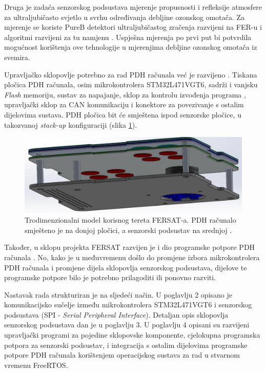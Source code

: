     Druga je zadaća senzorskog podsustava mjerenje propusnosti i refleksije atmosfere za ultraljubičasto svjetlo u svrhu određivanja debljine ozonskog omotača. Za mjerenje se koriste PureB detektori ultraljubičastog zračenja razvijeni na FER-u \cite{diplomski_filip_bogdanovic} i algoritmi razvijeni za tu namjenu \cite{zavrsni_kristian_stepancic}. Uspješna mjerenja po prvi put bi potvrdila mogućnost korištenja ove tehnologije u mjerenjima debljine ozonskog omotača iz svemira.

    Upravljačko sklopovlje potrebno za rad PDH računala već je razvijeno \cite{zavrsni_filip_juric}. Tiskana pločica PDH računala, osim mikrokontrolera STM32L471VGT6, sadrži i vanjsku \textit{Flash} memoriju, sustav za napajanje, sklop za kontrolu izvođenja programa , upravljački sklop za CAN komunikaciju i konektore za povezivanje s ostalim dijelovima sustava. PDH pločica bit će smještena ispod senzorske pločice, u takozvanoj \textit{stack-up} konfiguraciji (slika \ref{fig:fersat_3d}).

    \begin{figure}[htb]
        \centering
        \includegraphics[width=\textwidth]{slike/fersat_3d.png}
        \caption{Trodimenzionalni model korisnog tereta FERSAT-a. PDH računalo smješteno je na donjoj pločici, a senzorski podsustav na srednjoj \cite{zavrsni_filip_juric}.}
        \label{fig:fersat_3d}
    \end{figure}

    Također, u sklopu projekta FERSAT razvijen je i dio programske potpore PDH računala \cite{diplomski_goran_petrak}. No, kako je u međuvremenu došlo do promjene izbora mikrokontrolera PDH računala i promjene dijela sklopovlja senzorskog podsustava, dijelove te programske potpore bilo je potrebno prilagoditi ili ponovno razviti.
    
    Nastavak rada strukturiran je na sljedeći način. U poglavlju 2 opisano je komunikacijsko sučelje između mikrokontrolera STM32L471VGT6 i senzorskog podsustava (SPI - \textit{Serial Peripheral Interface}). Detaljan opis sklopovlja senzorskog podsustava dan je u poglavlju 3. U poglavlju 4 opisani su razvijeni upravljački programi za pojedine sklopovske komponente, cjelokupna programska potpora za senzorski podsustav, i integracija s ostalim dijelovima programske potpore PDH računala korištenjem operacijskog sustava za rad u stvarnom vremenu FreeRTOS.
